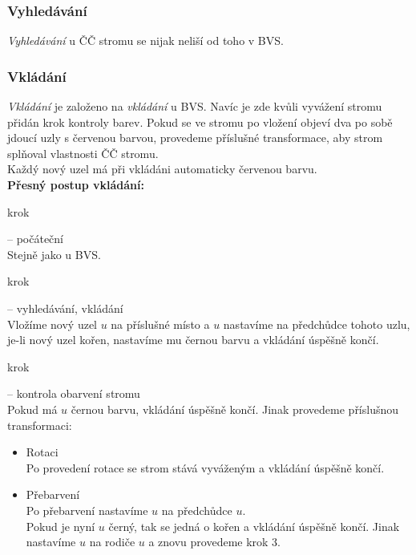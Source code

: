 \documentclass[
  biblatex=false,
  font=serif,
  glossaries=false,
  tables=false,
  theorems=false,
  index
]{kidiplom}
\begin{document}
\subsubsection{Vyhledávání}
\indent\indent \textit{Vyhledávání} u ČČ stromu se nijak neliší od toho v BVS.


\subsubsection{Vkládání}
\indent\indent \textit{Vkládání} je založeno na \textit{vkládání} u BVS. Navíc je zde kvůli vyvážení stromu přidán krok kontroly barev. Pokud se ve stromu po vložení objeví dva po sobě jdoucí uzly s červenou barvou, provedeme příslušné transformace, aby strom splňoval vlastnosti ČČ stromu.\\
\indent Každý nový uzel má při vkládáni automaticky červenou barvu.\\

\noindent \textbf{Přesný postup vkládání:}
\begin{enumerate} {\bfseries
\item  krok} -- počáteční \\
Stejně jako u BVS.
{\bfseries\item  krok} -- vyhledávání, vkládání \\
Vložíme nový uzel $u$ na příslušné místo a $u$ nastavíme na předchůdce tohoto uzlu, je-li nový uzel kořen, nastavíme mu černou barvu a vkládání úspěšně končí.
{\bfseries\item  krok} -- kontrola obarvení stromu \\
Pokud má $u$ černou barvu, vkládání úspěšně končí. Jinak provedeme příslušnou transformaci:
\begin{itemize}
\item Rotaci\\
Po provedení rotace se strom stává vyváženým a vkládání úspěšně končí.
\item Přebarvení\\
Po přebarvení nastavíme $u$ na předchůdce $u$.\\
Pokud je nyní $u$ černý, tak se jedná o kořen a vkládání úspěšně končí. Jinak nastavíme $u$ na rodiče $u$ a znovu provedeme krok 3.
\end{itemize}
\end{enumerate}
\end{document}
